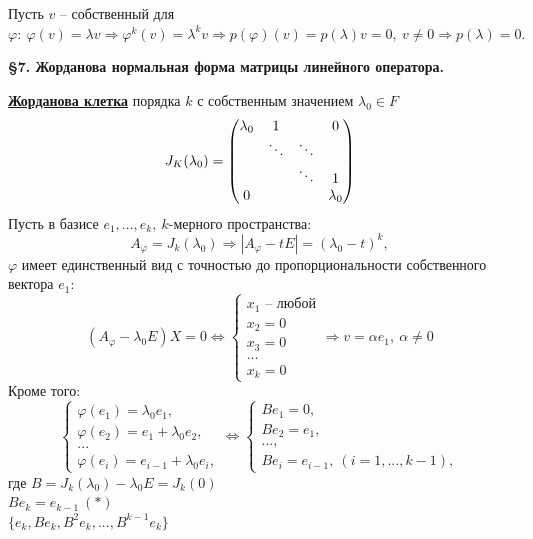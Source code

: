 \documentclass[a4paper, 12pt]{article}
\theoremstyle{definition}
\begin{document}
    Пусть $v$ -- собственный для $\varphi:\ \varphi(v) = 
    \lambda v \Longrightarrow \varphi^k(v) = \lambda^kv
    \Longrightarrow p(\varphi)(v) = p(\lambda)v = 0,\ v \neq 0
    \Longrightarrow p(\lambda) = 0.$
    \newpage
    \begin{center}
        \begin{Large}
            \textbf{\S 7. Жорданова нормальная форма матрицы
            линейного оператора.} 
        \end{Large}
    \end{center}
    \underline{\textbf{Жорданова клетка}} порядка $k$ с собственным
    значением $\lambda_0 \in F$
    $$J_K(\lambda_0) = 
    \begin{pmatrix}
        \lambda_0 & 1 & \null & 0\\
        \null & \ddots & \ddots & \null\\
        \null & \null & \ddots & 1\\
        0 & \null & \null & \lambda_0
    \end{pmatrix}
    $$
    Пусть в базисе $e_1,...,e_k,\ k$-мерного пространства:
    $$A_\varphi  =J_k(\lambda_0) \Longrightarrow |A_\varphi
    - t E| = (\lambda_0 - t)^k,$$ $\varphi$ имеет 
    единственный вид с точностью до пропорциональности
    собственного вектора $e_1:$$$(A_\varphi - \lambda_0 E)X = 0
    \Longleftrightarrow 
    \begin{cases}
        x_1 \text{ -- любой}\\x_2 = 0\\x_3 = 0\\\dots\\x_k = 0
    \end{cases}  \Longrightarrow 
    v = \alpha e_1,\ \alpha \neq 0$$  
    Кроме того:
    $$\begin{cases}
        \varphi(e_1) = \lambda_0e_1,\\
        \varphi(e_2) = e_1 + \lambda_0e_2,\\...
        \\\varphi(e_i) = e_{i-1} + \lambda_0e_i,
    \end{cases} \Longleftrightarrow  
    \begin{cases}
        Be_1 = 0,\\ Be_2 = e_1,\\...,\\
    Be_i = e_{i-1},\ (i = 1,...,k-1),
    \end{cases}$$где $B = J_k(\lambda_0) - \lambda_0E = J_k(0)$ 
    \\$Be_k = e_{k-1}\ (*)$\\$\{e_k, Be_k, B^2e_k,...,B^{k-1}e_k\}$
\end{document}

